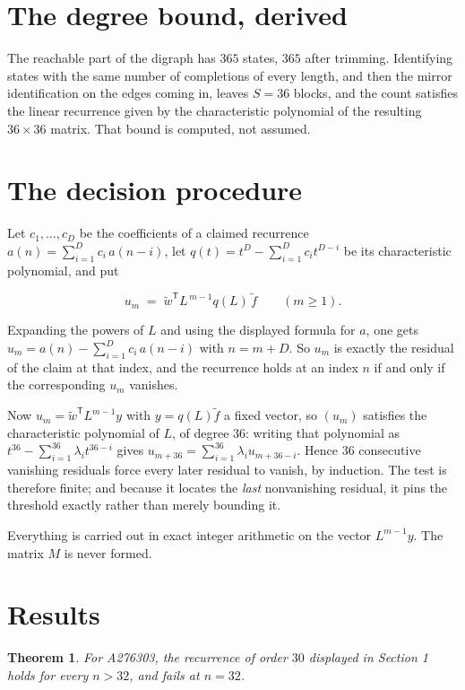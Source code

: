 \documentclass[11pt]{article}
\newtheorem{theorem}{Theorem}
\theoremstyle{definition}
\begin{document}
\section{The degree bound, derived}

The reachable part of the digraph has $365$ states, $365$ after trimming. Identifying states with the same number of completions of every length, and then the mirror identification on the edges coming in, leaves $S = 36$ blocks, and the count satisfies the linear recurrence given by the characteristic polynomial of the resulting $36\times36$ matrix. That bound is computed, not assumed.

\section{The decision procedure}

Let $c_1,\dots,c_D$ be the coefficients of a claimed recurrence $a(n) = \sum_{i=1}^{D} c_i\,a(n-i)$, let $q(t) = t^{D} - \sum_{i=1}^{D} c_i t^{D-i}$ be its characteristic polynomial, and put

\[u_m \;=\; \tilde w^{\mathsf T} L^{\,m-1} q(L)\,\tilde f \qquad (m \ge 1).\]

Expanding the powers of $L$ and using the displayed formula for $a$, one gets $u_m = a(n) - \sum_{i=1}^{D} c_i\,a(n-i)$ with $n = m + D$. So $u_m$ is exactly the residual of the claim at that index, and the recurrence holds at an index $n$ if and only if the corresponding $u_m$ vanishes.

Now $u_m = \tilde w^{\mathsf T} L^{m-1} y$ with $y = q(L)\tilde f$ a fixed vector, so $(u_m)$ satisfies the characteristic polynomial of $L$, of degree $36$: writing that polynomial as $t^{36} - \sum_{i=1}^{36} \lambda_i t^{36-i}$ gives $u_{m+36} = \sum_{i=1}^{36} \lambda_i u_{m+36-i}$. Hence $36$ consecutive vanishing residuals force every later residual to vanish, by induction. The test is therefore finite; and because it locates the {\itshape last} nonvanishing residual, it pins the threshold exactly rather than merely bounding it.

Everything is carried out in exact integer arithmetic on the vector $L^{m-1}y$. The matrix $M$ is never formed.

\section{Results}

\begin{theorem} For A276303, the recurrence of order $30$ displayed in Section 1 holds for every $n > 32$, and fails at $n = 32$.\end{theorem}
\end{document}
